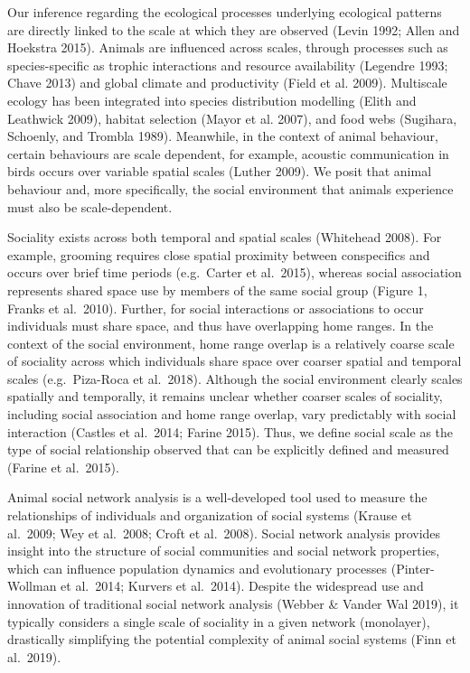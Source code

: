 \documentclass[]{article}
\begin{document}
Our inference regarding the ecological processes underlying ecological patterns
are directly linked to the scale at which they are observed (Levin 1992; Allen and Hoekstra 2015). Animals are influenced across scales, through processes such as
species-specific as trophic interactions and resource availability
(Legendre 1993; Chave 2013) and global climate and productivity (Field et al. 2009).
Multiscale ecology has been integrated into species distribution modelling
(Elith and Leathwick 2009), habitat selection (Mayor et al. 2007), and food webs (Sugihara, Schoenly, and Trombla 1989).
Meanwhile, in the context of animal behaviour, certain behaviours are scale
dependent, for example, acoustic communication in birds occurs over variable
spatial scales (Luther 2009). We posit that animal behaviour and, more
specifically, the social environment that animals experience must also be
scale-dependent.

Sociality exists across both temporal and spatial scales (Whitehead 2008). For
example, grooming requires close spatial proximity between conspecifics and
occurs over brief time periods (e.g.~Carter et al.~2015), whereas social
association represents shared space use by members of the same social group
(Figure 1, Franks et al.~2010). Further, for social interactions or associations
to occur individuals must share space, and thus have overlapping home ranges. In
the context of the social environment, home range overlap is a relatively coarse
scale of sociality across which individuals share space over coarser spatial and
temporal scales (e.g.~Piza-Roca et al.~2018). Although the social environment
clearly scales spatially and temporally, it remains unclear whether coarser
scales of sociality, including social association and home range overlap, vary
predictably with social interaction (Castles et al.~2014; Farine 2015). Thus, we
define social scale as the type of social relationship observed that can be
explicitly defined and measured (Farine et al.~2015).

Animal social network analysis is a well-developed tool used to measure the
relationships of individuals and organization of social systems (Krause et
al.~2009; Wey et al.~2008; Croft et al.~2008). Social network analysis provides
insight into the structure of social communities and social network properties,
which can influence population dynamics and evolutionary processes
(Pinter-Wollman et al.~2014; Kurvers et al.~2014). Despite the widespread use
and innovation of traditional social network analysis (Webber \& Vander Wal
2019), it typically considers a single scale of sociality in a given network
(monolayer), drastically simplifying the potential complexity of animal social
systems (Finn et al.~2019).
\end{document}
